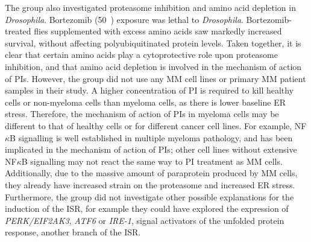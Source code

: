 The group also investigated proteasome inhibition and amino acid depletion in \textit{Drosophila}\cite{suraweera2012failure}.
Bortezomib (50\si{\micro\Molar}) exposure was lethal to \textit{Drosophila}.
Bortezomib-treated flies supplemented with excess amino acids saw markedly increased survival, without affecting polyubiquitinated protein levels.
Taken together, it is clear that certain amino acids play a cytoprotective role upon proteasome inhibition, and that amino acid depletion is involved in the mechanism of action of PIs.
However, the group did not use any MM cell lines or primary MM patient samples in their study.
A higher concentration of PI is required to kill healthy cells or non-myeloma cells than myeloma cells, as there is lower baseline ER stress.
Therefore, the mechanism of action of PIs in myeloma cells may be different to that of healthy cells or for different cancer cell lines.
For example, NF$\kappa$B signalling is well established in multiple myeloma pathology, and has been implicated in the mechanism of action of PIs; other cell lines without extensive NF$\kappa$B signalling may not react the same way to PI treatment as MM cells.
Additionally, due to the massive amount of paraprotein produced by MM cells, they already have increased strain on the proteasome and increased ER stress.
Furthermore, the group did not investigate other possible explanations for the induction of the ISR, for example they could have explored the expression of \textit{PERK/EIF2AK3}, \textit{ATF6} or \textit{IRE-1}, signal activators of the unfolded protein response, another branch of the ISR\@.


